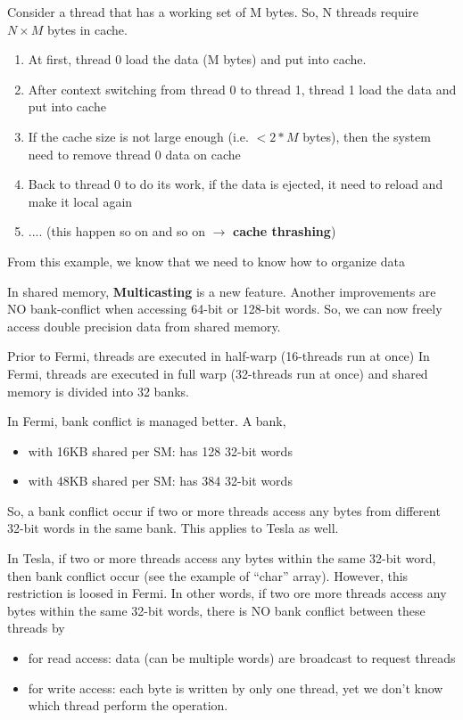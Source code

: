 Consider a thread that has a working set of M bytes. So, N threads
require $N\times M$ bytes in cache. 
\begin{enumerate}
\item At first, thread 0 load the data (M bytes) and put into cache.
\item After context switching from thread 0 to thread 1, thread 1 load
  the data and put into cache
\item If the cache size is not large enough (i.e. $< 2*M$ bytes), then
  the system need to remove thread 0 data on cache
\item Back to thread 0 to do its work, if the data is ejected, it need
  to reload and make it local again
\item .... (this happen so on and so on $\rightarrow$ {\bf cache thrashing})
\end{enumerate}
From this example, we know that we need to know how to organize data 

\begin{framed}
  In shared memory, {\bf Multicasting} is a new feature. Another
  improvements are NO bank-conflict when accessing 64-bit or 128-bit
  words. So, we can now freely access double precision data from
  shared memory.
\end{framed}


Prior to Fermi, threads are executed in half-warp (16-threads run at
once) In Fermi, threads are executed in full warp (32-threads run at
once) and shared memory is divided into 32 banks.

In Fermi, bank conflict is managed better.  A bank,
\begin{itemize}
\item with 16KB shared per SM: has 128 32-bit words
\item with 48KB shared per SM: has 384 32-bit words
\end{itemize}
So, a bank conflict occur if two or more threads access any bytes from
different 32-bit words in the same bank. This applies to Tesla as
well.

In Tesla, if two or more threads access any bytes within the same
32-bit word, then bank conflict occur (see the example of ``char''
array). However, this restriction is loosed in Fermi. In other words,
if two ore more threads access any bytes within the same 32-bit words,
there is NO bank conflict between these threads by
\begin{itemize}
\item for read access: data (can be multiple words) are broadcast to
  request threads
\item for write access: each byte is written by only one thread, yet
  we don't know which thread perform the operation. 
\end{itemize}

